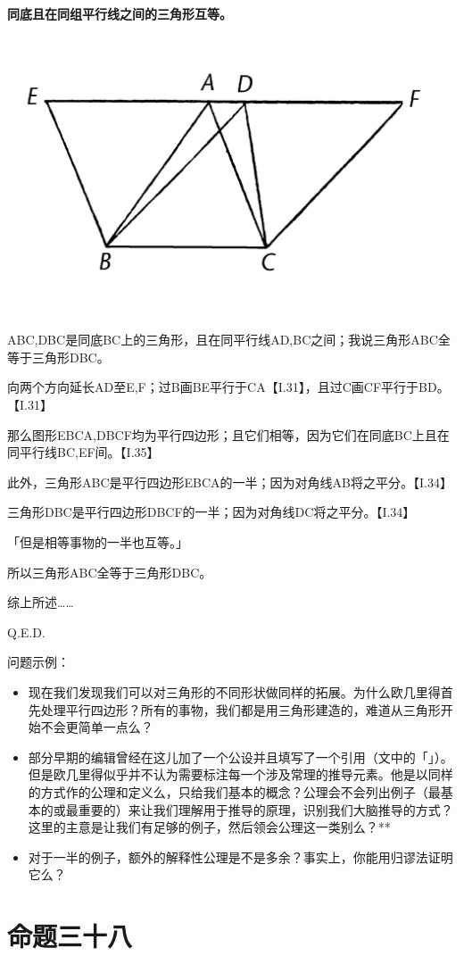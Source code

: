 \documentclass[
]{book}
\providecommand{\tightlist}{%
  \setlength{\itemsep}{0pt}\setlength{\parskip}{0pt}}
\begin{document}
\textbf{同底且在同组平行线之间的三角形互等。}

\includegraphics[width=0.5\linewidth]{./image/img532}

ABC,DBC是同底BC上的三角形，且在同平行线AD,BC之间；我说三角形ABC全等于三角形DBC。

向两个方向延长AD至E,F；过B画BE平行于CA【I.31】，且过C画CF平行于BD。【I.31】

那么图形EBCA,DBCF均为平行四边形；且它们相等，因为它们在同底BC上且在同平行线BC,EF间。【I.35】

此外，三角形ABC是平行四边形EBCA的一半；因为对角线AB将之平分。【I.34】

三角形DBC是平行四边形DBCF的一半；因为对角线DC将之平分。【I.34】

「但是相等事物的一半也互等。」

所以三角形ABC全等于三角形DBC。

综上所述\ldots\ldots{}

Q.E.D.

问题示例：

\begin{itemize}
\tightlist
\item
  现在我们发现我们可以对三角形的不同形状做同样的拓展。为什么欧几里得首先处理平行四边形？所有的事物，我们都是用三角形建造的，难道从三角形开始不会更简单一点么？
\item
  部分早期的编辑曾经在这儿加了一个公设并且填写了一个引用（文中的「」）。但是欧几里得似乎并不认为需要标注每一个涉及常理的推导元素。他是以同样的方式作的公理和定义么，只给我们基本的概念？公理会不会列出例子（最基本的或最重要的）来让我们理解用于推导的原理，识别我们大脑推导的方式？这里的主意是让我们有足够的例子，然后领会公理这一类别么？**
\item
  对于一半的例子，额外的解释性公理是不是多余？事实上，你能用归谬法证明它么？
\end{itemize}

\hypertarget{ux547dux9898ux4e09ux5341ux516b}{%
\section{命题三十八}\label{ux547dux9898ux4e09ux5341ux516b}}
\end{document}
